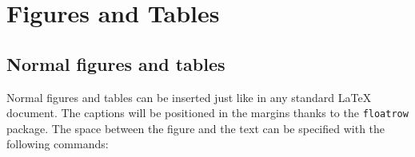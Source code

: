 \setchapterpreamble[u]{\margintoc[*-4.5]}

\makeatletter
\renewcommand{\chapterlinesformat}[3]{%
  \@hangfrom{#2}{#3}%
}
\makeatother
\renewcommand*{\chapterformat}{%
  \mbox{\chapappifchapterprefix{\nobreakspace}\thechapter
	\autodot\IfUsePrefixLine{}{\enskip}}}

\chapter{Figures and Tables}

\section{Normal figures and tables}

Normal figures and tables can be inserted just like in any standard 
\LaTeX\xspace document. The captions will be positioned in the margins 
thanks to the \verb|floatrow| package. The space between the figure and 
the text can be specified with the following commands:

